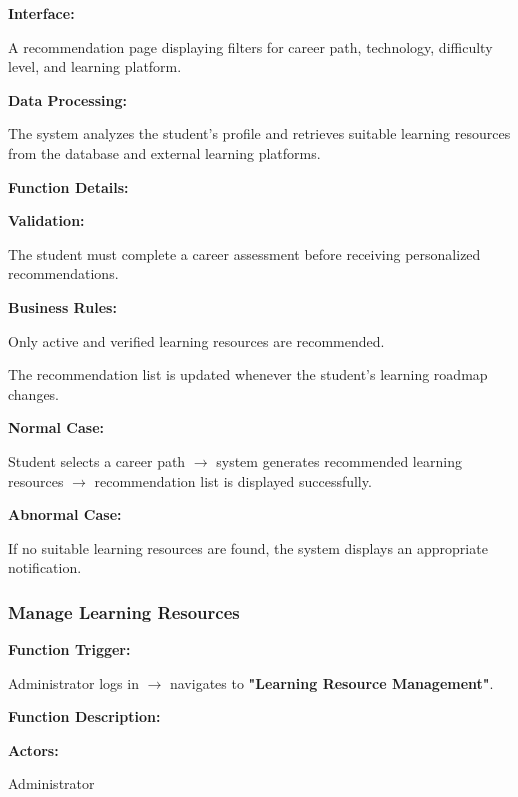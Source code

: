 \vspace{0.2cm}

\textbf{Interface:}

A recommendation page displaying filters for career path, technology, difficulty level, and learning platform.

\vspace{0.2cm}

\textbf{Data Processing:}

The system analyzes the student's profile and retrieves suitable learning resources from the database and external learning platforms.

\vspace{0.3cm}

\textbf{Function Details:}

\textbf{Validation:}

The student must complete a career assessment before receiving personalized recommendations.

\textbf{Business Rules:}

Only active and verified learning resources are recommended.

The recommendation list is updated whenever the student's learning roadmap changes.

\textbf{Normal Case:}

Student selects a career path $\rightarrow$ system generates recommended learning resources $\rightarrow$ recommendation list is displayed successfully.

\textbf{Abnormal Case:}

If no suitable learning resources are found, the system displays an appropriate notification.

\subsubsection{Manage Learning Resources}

\textbf{Function Trigger:}

Administrator logs in $\rightarrow$ navigates to \textbf{"Learning Resource Management"}.

\vspace{0.3cm}

\textbf{Function Description:}

\textbf{Actors:}

Administrator

\vspace{0.2cm}

